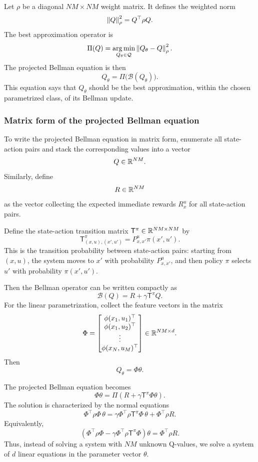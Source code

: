 Let \(\rho\) be a diagonal \(NM\times NM\) weight matrix. It defines the weighted norm
\[
\left\lVert Q \right\rVert_\rho^2
=
Q^\top\rho Q.
\]
The best approximation operator is
\[
\Pi(Q)
=
\operatorname*{arg\,min}_{Q_\theta\in\mathcal{Q}}
\left\lVert Q_\theta-Q \right\rVert_\rho^2.
\]
The projected Bellman equation is then
\[
Q_\theta
=
\Pi\bigl(\mathcal{B}(Q_\theta)\bigr).
\]
This equation says that \(Q_\theta\) should be the best approximation, within the chosen
parametrized class, of its Bellman update.

\subsubsection{Matrix form of the projected Bellman equation}

To write the projected Bellman equation in matrix form, enumerate all state-action pairs and
stack the corresponding values into a vector
\[
Q\in\mathbb{R}^{NM}.
\]
Similarly, define
\[
R\in\mathbb{R}^{NM}
\]
as the vector collecting the expected immediate rewards \(R_x^u\) for all state-action pairs.

Define the state-action transition matrix \(\mathsf{T}^{\pi}\in\mathbb{R}^{NM\times NM}\) by
\[
\mathsf{T}^{\pi}_{(x,u),(x',u')}
=
P^u_{x,x'}\pi(x',u').
\]
This is the transition probability between state-action pairs: starting from \((x,u)\), the system
moves to \(x'\) with probability \(P^u_{x,x'}\), and then policy \(\pi\) selects \(u'\) with
probability \(\pi(x',u')\).

Then the Bellman operator can be written compactly as
\[
\mathcal{B}(Q)
=
R+\gamma\mathsf{T}^{\pi}Q.
\]
For the linear parametrization, collect the feature vectors in the matrix
\[
\Phi
=
\begin{bmatrix}
\phi(x_1,u_1)^\top\\
\phi(x_1,u_2)^\top\\
\vdots\\
\phi(x_N,u_M)^\top
\end{bmatrix}
\in\mathbb{R}^{NM\times d}.
\]
Then
\[
Q_\theta=\Phi\theta.
\]

The projected Bellman equation becomes
\[
\Phi\theta
=
\Pi\left(R+\gamma\mathsf{T}^{\pi}\Phi\theta\right).
\]
The solution is characterized by the normal equations
\[
\Phi^\top\rho\Phi\,\theta
=
\gamma\Phi^\top\rho\mathsf{T}^{\pi}\Phi\,\theta
+
\Phi^\top\rho R.
\]
Equivalently,
\[
\left(
\Phi^\top\rho\Phi
-
\gamma\Phi^\top\rho\mathsf{T}^{\pi}\Phi
\right)\theta
=
\Phi^\top\rho R.
\]
Thus, instead of solving a system with \(NM\) unknown Q-values, we solve a system of \(d\)
linear equations in the parameter vector \(\theta\).


